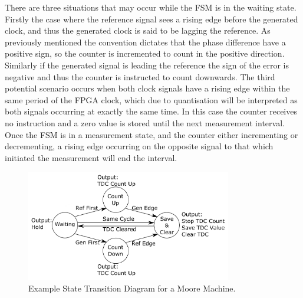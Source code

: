 There are three situations that may occur while the \ac{FSM} is in the waiting state. Firstly the case where the reference signal sees a rising edge before the generated clock, and thus the generated clock is said to be lagging the reference. As previously mentioned the convention dictates that the phase difference have a positive sign, so the counter is incremented to count in the positive direction. Similarly if the generated signal is leading the reference the sign of the error is negative and thus the counter is instructed to count downwards. The third potential scenario occurs when both clock signals have a rising edge within the same period of the \ac{FPGA} clock, which due to quantisation will be interpreted as both signals occurring at exactly the same time. In this case the counter receives no instruction and a zero value is stored until the next measurement interval. Once the \ac{FSM} is in a measurement state, and the counter either incrementing or decrementing, a rising edge occurring on the opposite signal to that which initiated the measurement will end the interval.
\begin{figure}[h]
	\centering
	\includegraphics[width=0.8\textwidth]{../state_trans_new}
	\caption[Example State Transition Diagram for a Moore Machine]{Example State Transition Diagram for a Moore Machine.}
	\label{fig:state_trans}
\end{figure}

